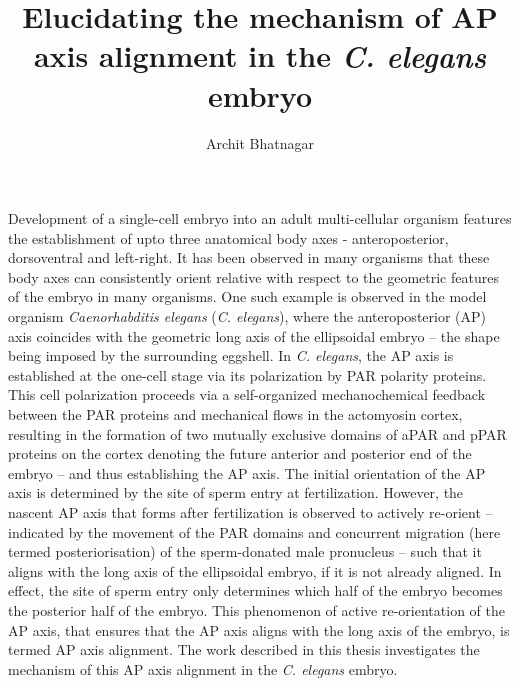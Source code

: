 \documentclass[a4paper]{article}
\title{Elucidating the mechanism of AP axis alignment in the \textit{C. elegans} embryo}
\author{Archit Bhatnagar}
\date{}
\begin{document}
\maketitle 
\thispagestyle{empty}

Development of a single-cell embryo into an adult multi-cellular organism features the establishment of upto three anatomical body axes - anteroposterior, dorsoventral and left-right. It has been observed in many organisms that these body axes can consistently orient relative with respect to the geometric features of the embryo in many organisms. One such example is observed in the model organism \textit{Caenorhabditis elegans} (\textit{C. elegans}), where the anteroposterior (AP) axis coincides with the geometric long axis of the ellipsoidal embryo -- the shape being imposed by the surrounding eggshell. In \textit{C. elegans}, the AP axis is established at the one-cell stage via its polarization by PAR polarity proteins. This cell polarization proceeds via a self-organized mechanochemical feedback between the PAR proteins and mechanical flows in the actomyosin cortex, resulting in the formation of two mutually exclusive domains of aPAR and pPAR proteins on the cortex denoting the future anterior and posterior end of the embryo -- and thus establishing the AP axis. The initial orientation of the AP axis is determined by the site of sperm entry at fertilization. However, the nascent AP axis that forms after fertilization is observed to actively re-orient -- indicated by the movement of the PAR domains and concurrent migration (here termed posteriorisation) of the sperm-donated male pronucleus -- such that it aligns with the long axis of the ellipsoidal embryo, if it is not already aligned. In effect, the site of sperm entry only determines which half of the embryo becomes the posterior half of the embryo. This phenomenon of active re-orientation of the AP axis, that ensures that the AP axis aligns with the long axis of the embryo, is termed AP axis alignment. The work described in this thesis investigates the mechanism of this AP axis alignment in the \textit{C. elegans} embryo.
\end{document}
